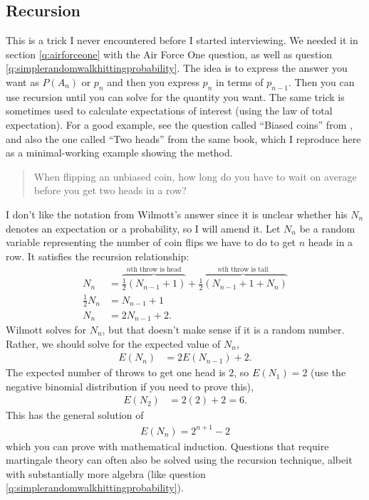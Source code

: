 \documentclass[a4paper]{article}
\begin{document}
\subsection{Recursion}
This is a trick I never encountered before I started interviewing.
We needed it in section \ref{q:airforceone} with the Air Force One question, as well as question \ref{q:simplerandomwalkhittingprobability}.
The idea is to express the answer you want as $P(A_n)$ or $p_n$ and then you express $p_n$ in terms of $p_{n-1}$.
Then you can use recursion until you can solve for the quantity you want.
The same trick is sometimes used to calculate expectations of interest (using the law of total expectation).
For a good example, see the question called ``Biased coins'' from \citet{WilmottFAQ}, and also the one called ``Two heads'' from the same book, which I reproduce here as a minimal-working example showing the method.

\begin{quote}
 When flipping an unbiased coin, how long do you have to wait on average before you get two heads in a row?
\end{quote}
I don't like the notation from Wilmott's answer since it is unclear whether his $N_n$ denotes an expectation or a probability, so I will amend it.
Let $N_n$ be a random variable representing the number of coin flips we have to do to get $n$ heads in a row.
It satisfies the recursion relationship:
\begin{align*}
  N_n &=
  \overbrace{ \frac{1}{2} (N_{n-1} + 1)}^{n\text{th throw is head}}
  +
  \overbrace{\frac{1}{2} (N_{n-1} + 1 + N_n)}^{n\text{th throw is tail}}
  \\
  \frac{1}{2}  N_n &=
   N_{n-1} + 1
  \\
  N_n &=
  2 N_{n-1} + 2
  \text{.}
\end{align*}
Wilmott solves for $N_n$, but that doesn't make sense if it is a random number.
Rather, we should solve for the expected value of $N_n$,
\begin{align*}
  E(N_n) &= 2 E(N_{n-1}) + 2
  \text{.}
\end{align*}
The expected number of throws to get one head is $2$, so
$E(N_1) = 2$ (use the negative binomial distribution if you need to prove this),
\begin{align*}
  E(N_2) &= 2(2) + 2 = 6
  \text{.}
\end{align*}
This has the general solution of
\begin{align*}
  E(N_n) = 2^{n+1} - 2
\end{align*}
which you can prove with mathematical induction.
Questions that require martingale theory can often also be solved using the recursion technique, albeit with substantially more algebra (like question \ref{q:simplerandomwalkhittingprobability}).
\end{document}

